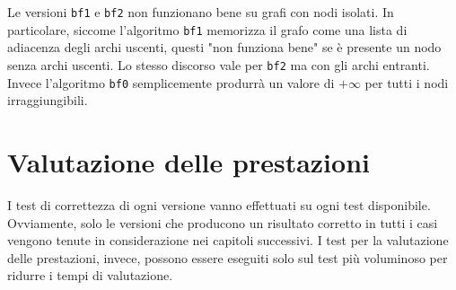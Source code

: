 \documentclass[a4paper]{article}
\begin{document}
	Le versioni \texttt{bf1} e \texttt{bf2} non funzionano bene su grafi con nodi isolati. In particolare, siccome l'algoritmo \texttt{bf1} memorizza il grafo come una lista di adiacenza degli archi uscenti, questi "non funziona bene" se è presente un nodo senza archi uscenti. Lo stesso discorso vale per \texttt{bf2} ma con gli archi entranti. Invece l'algoritmo \texttt{bf0} semplicemente produrrà un valore di $+\infty$ per tutti i nodi irraggiungibili.
	
	\section{Valutazione delle prestazioni}
	\label{section:perf}
	I test di correttezza di ogni versione vanno effettuati su ogni test disponibile. Ovviamente, solo le versioni che producono un risultato corretto in tutti i casi vengono tenute in considerazione nei capitoli successivi. I test per la valutazione delle prestazioni, invece, possono essere eseguiti solo sul test più voluminoso per ridurre i tempi di valutazione.
	
\end{document}
